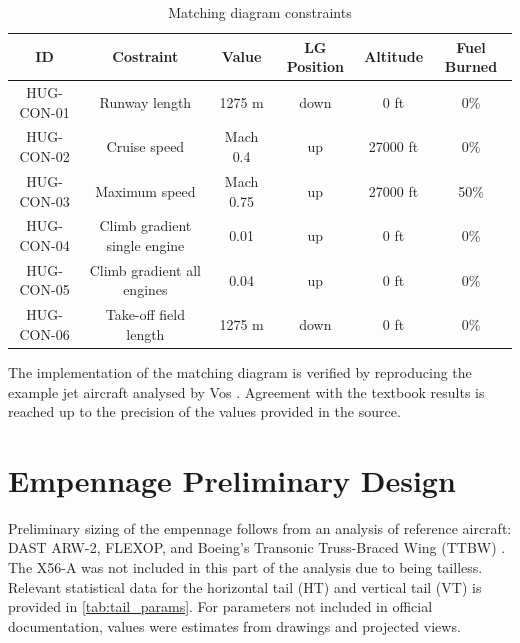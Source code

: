 \begin{table}[h]
\centering
\caption{Matching diagram constraints}
\label{tab: Matching diagram constraints}
\begin{tabular}
{|c|c|c|c|c|c|}
    \hline
    \textbf{ID} & \textbf{Costraint} & \textbf{Value} & \textbf{LG Position} & \textbf{Altitude} & \textbf{Fuel Burned} \\
    \hline\hline
    HUG-CON-01 & Runway length & 1275 m& down & 0 ft & 0\% \\
    \hline
    HUG-CON-02 & Cruise speed & Mach 0.4 & up & 27000 ft & 0\% \\
    \hline
    HUG-CON-03 & Maximum speed & Mach 0.75 & up & 27000 ft & 50\% \\
    \hline
    HUG-CON-04 & Climb gradient single engine & 0.01 & up & 0 ft & 0\% \\
    \hline
    HUG-CON-05 & Climb gradient all engines & 0.04 & up & 0 ft& 0\% \\
    \hline
    HUG-CON-06 & Take-off field length & 1275 m & down & 0 ft & 0\% \\
    \hline
    \end{tabular}
\end{table}

The implementation of the matching diagram is verified by reproducing the example jet aircraft analysed by Vos \cite{Vos}. Agreement with the textbook results is reached up to the precision of the values provided in the source.




\section{Empennage Preliminary Design}
\label{sec:empennage_preliminary_design}
Preliminary sizing of the empennage follows from an analysis of reference aircraft: DAST ARW-2, FLEXOP, and Boeing's Transonic Truss-Braced Wing (TTBW) \cite{XiongBoeing}. The X56-A was not included in this part of the analysis due to being tailless. Relevant statistical data for the horizontal tail (HT) and vertical tail (VT) is provided in \autoref{tab:tail_params}. For parameters not included in official documentation, values were estimates from drawings and projected views.

